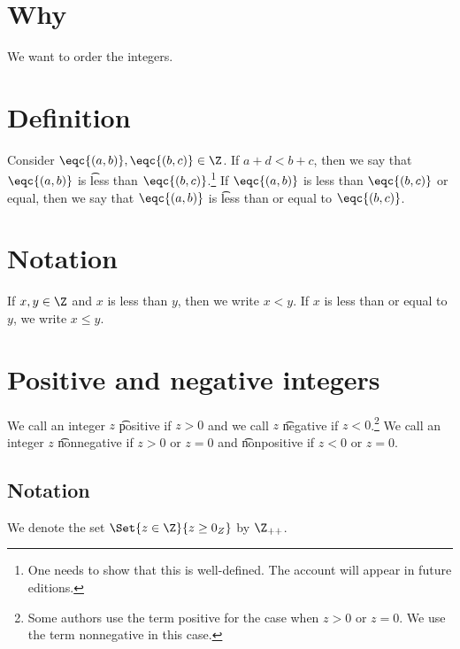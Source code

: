

\section*{Why}

We want to order the integers.

\section*{Definition}

Consider $\eqc{(a, b)}, \eqc{(b, c)} \in \Z $.
If $a + d < b + c$, then we say that
$\eqc{(a, b)}$ is \t{less than} $\eqc{(b, c)}$.\footnote{One needs to show that this is well-defined. The account will appear in future editions.}
If $\eqc{(a, b)}$ is less than $\eqc{(b, c)}$ or equal, then we say that $\eqc{(a, b)}$ is \t{less than or equal to} $\eqc{(b, c)}$.

\section*{Notation}

If $x, y \in \Z $ and $x$ is less than $y$, then we write $x < y$.
If $x$ is less than or equal to $y$, we write $x \leq y$.

\section*{Positive and negative integers}

We call an integer $z$ \t{positive} if $z > 0$ and we call $z$ \t{negative} if $z < 0$.\footnote{Some authors use the term positive for the case when $z > 0$ or $z = 0$. We use the term nonnegative in this case.}
We call an integer $z$ \t{nonnegative} if $z > 0$ or $z = 0$ and \t{nonpositive} if $z < 0$ or $z = 0$.

\subsection*{Notation}

We denote the set $\Set{z \in \Z }{z \geq 0_{Z}}$ by $\Z _{++}$.

\blankpage